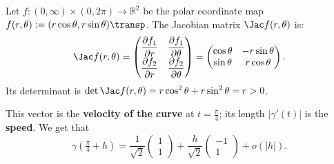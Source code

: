 \begin{aiexample}
Let $f \colon (0,\infty) \times (0,2\pi) \to \mathbb{R}^2$ be the polar coordinate map $f(r,\theta) := (r\cos\theta, r\sin\theta)\transp$. The Jacobian matrix $\Jac f(r,\theta)$ is:
\[
\Jac f(r,\theta) = \begin{pmatrix} \dfrac{\partial f_1}{\partial r} & \dfrac{\partial f_1}{\partial \theta} \\[1ex] \dfrac{\partial f_2}{\partial r} & \dfrac{\partial f_2}{\partial \theta} \end{pmatrix} = \begin{pmatrix} \cos\theta & -r\sin\theta \\ \sin\theta & r\cos\theta \end{pmatrix}.
\]
Its determinant is $\det \Jac f(r,\theta) = r\cos^2\theta + r\sin^2\theta = r > 0$.
\end{aiexample}

\begin{center}
\end{center}

This vector is the \textbf{velocity of the curve}  at
$t = \tfrac{\pi}{4}$; its length $|\gamma'(t)|$ is the \textbf{speed}. We get that
\[\gamma\!\left(\tfrac{\pi}{4}+h\right) = \frac{1}{\sqrt{2}}\begin{pmatrix}1\\1\end{pmatrix} + \frac{h}{\sqrt{2}}\begin{pmatrix}-1\\1\end{pmatrix} + o(|h|).\]

